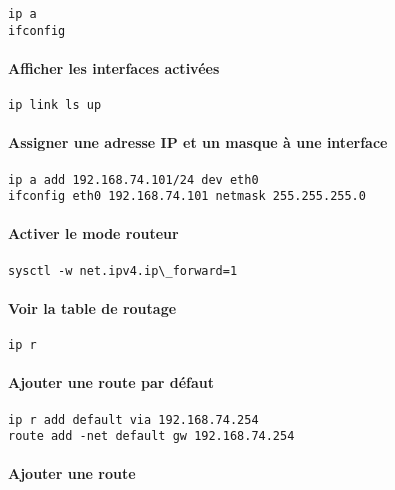 \documentclass[10pt,a4paper,french]{article}
\begin{document}
\begin{verbatim}
ip a
ifconfig
\end{verbatim}

\paragraph{Afficher les interfaces activées}

\begin{verbatim}
ip link ls up
\end{verbatim}

\paragraph{Assigner une adresse IP et un masque à une interface}

\begin{verbatim}
ip a add 192.168.74.101/24 dev eth0
ifconfig eth0 192.168.74.101 netmask 255.255.255.0
\end{verbatim}

\paragraph{Activer le mode routeur}

\begin{verbatim}
sysctl -w net.ipv4.ip\_forward=1
\end{verbatim}

\paragraph{Voir la table de routage}

\begin{verbatim}
ip r
\end{verbatim}

\paragraph{Ajouter une route par défaut}

\begin{verbatim}
ip r add default via 192.168.74.254
route add -net default gw 192.168.74.254
\end{verbatim}

\paragraph{Ajouter une route}
\end{document}
